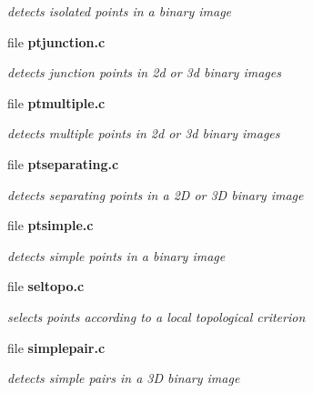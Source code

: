 \begin{DoxyCompactItemize}
\begin{DoxyCompactList}\small\item\em detects isolated points in a binary image \item\end{DoxyCompactList}

\item 
file {\bf ptjunction.c}


\begin{DoxyCompactList}\small\item\em detects junction points in 2d or 3d binary images \item\end{DoxyCompactList}

\item 
file {\bf ptmultiple.c}


\begin{DoxyCompactList}\small\item\em detects multiple points in 2d or 3d binary images \item\end{DoxyCompactList}

\item 
file {\bf ptseparating.c}


\begin{DoxyCompactList}\small\item\em detects separating points in a 2D or 3D binary image \item\end{DoxyCompactList}

\item 
file {\bf ptsimple.c}


\begin{DoxyCompactList}\small\item\em detects simple points in a binary image \item\end{DoxyCompactList}

\item 
file {\bf seltopo.c}


\begin{DoxyCompactList}\small\item\em selects points according to a local topological criterion \item\end{DoxyCompactList}

\item 
file {\bf simplepair.c}


\begin{DoxyCompactList}\small\item\em detects simple pairs in a 3D binary image \item\end{DoxyCompactList}


\end{DoxyCompactItemize}
